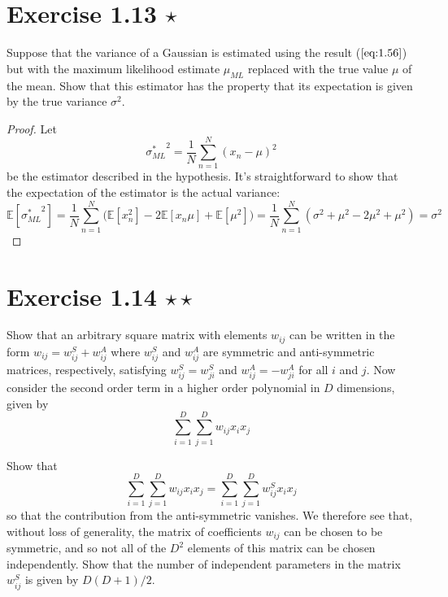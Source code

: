 \section*{Exercise 1.13 $\star$}
Suppose that the variance of a Gaussian is estimated using the result ($\ref{eq:1.56}$) but
with the maximum likelihood estimate $\mu_{ML}$ replaced with the true value $\mu$ of
the mean. Show that this estimator has the property that its expectation is given by the
true variance $\sigma^2$.

\vspace{1em}

\begin{proof}
Let 
 \[
     {\sigma_{ML}^*}^2 = \frac{1}{N} \sum_{n=1}^{N} (x_n - \mu)^2
\] 
be the estimator described in the hypothesis. It's straightforward to show that the
expectation of the estimator is the actual variance:
\[
    \mathbb{E}[{\sigma_{ML}^*}^2] = \frac{1}{N} \sum_{n=1}^{N} 
        \bigg(\mathbb{E}[x_n^2] - 2\mathbb{E}[x_n \mu] + \mathbb{E}[\mu^2]\bigg)
        =\frac{1}{N} \sum_{n=1}^{N} (\sigma^2 + \mu^2 - 2\mu^2 + \mu^2) = \sigma^2
\] 
\end{proof}

\section*{Exercise 1.14 $\star \star$} Show that an arbitrary square matrix with elements $w_{ij}$ can
be written in the form $w_{ij} = w_{ij}^S + w_{ij}^A$ where $w_{ij}^S$ and $w_{ij}^A$ are
symmetric and anti-symmetric matrices, respectively, satisfying $w_{ij}^S = w_{ji}^S$ and
$w_{ij}^A = -w_{ji}^A$ for all $i$ and $j$. Now consider the second order term in a higher
order polynomial in $D$ dimensions, given by
\begin{equation*}
    \sum_{i=1}^{D} \sum_{j=1}^{D} w_{ij}x_ix_j
    \tag{1.131}\label{eq:1.131}
\end{equation*}

Show that 
\begin{equation*}
    \sum_{i=1}^{D} \sum_{j=1}^{D} w_{ij}x_ix_j = \sum_{i=1}^{D} \sum_{j=1}^{D} w_{ij}^S x_ix_j
    \tag{1.132}\label{eq:1.132}
\end{equation*}
so that the contribution from the anti-symmetric vanishes. We therefore see
that, without loss of generality, the matrix of coefficients $w_{ij}$ can be chosen
to be symmetric, and so not all of the $D^2$ elements of this matrix can be chosen
independently. Show that the number of independent parameters in the matrix $w_{ij}^S$
is given by  $D(D+1)/2$.

